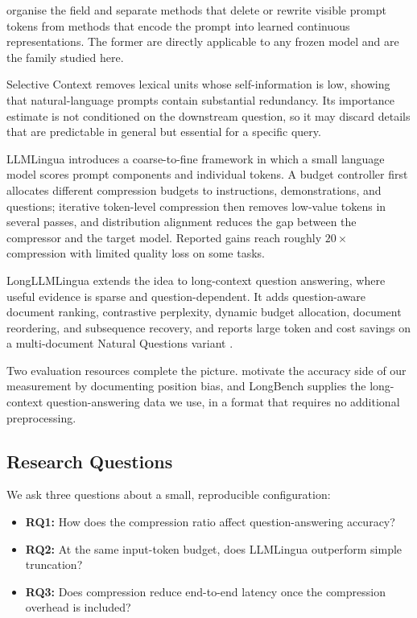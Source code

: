 \documentclass[10pt,a4paper,twocolumn]{article}
\begin{document}
\citet{li-etal-2025-prompt-survey} organise the field and separate methods that
delete or rewrite visible prompt tokens from methods that encode the prompt into
learned continuous representations. The former are directly applicable to any
frozen model and are the family studied here.

Selective Context \citep{li-etal-2023-compressing} removes lexical units whose
self-information is low, showing that natural-language prompts contain
substantial redundancy. Its importance estimate is not conditioned on the
downstream question, so it may discard details that are predictable in general but
essential for a specific query.

LLMLingua \citep{jiang-etal-2023-llmlingua} introduces a coarse-to-fine framework
in which a small language model scores prompt components and individual tokens.
A budget controller first allocates different compression budgets to instructions,
demonstrations, and questions; iterative token-level compression then removes
low-value tokens in several passes, and distribution alignment reduces the gap
between the compressor and the target model. Reported gains reach roughly
$20\times$ compression with limited quality loss on some tasks.

LongLLMLingua \citep{jiang-etal-2024-longllmlingua} extends the idea to
long-context question answering, where useful evidence is sparse and
question-dependent. It adds question-aware document ranking, contrastive
perplexity, dynamic budget allocation, document reordering, and subsequence
recovery, and reports large token and cost savings on a multi-document Natural
Questions variant \citep{kwiatkowski-etal-2019-natural}.

Two evaluation resources complete the picture. \citet{liu-etal-2024-lost} motivate
the accuracy side of our measurement by documenting position bias, and LongBench
\citep{bai-etal-2024-longbench} supplies the long-context question-answering data
we use, in a format that requires no additional preprocessing.

\subsection{Research Questions}

We ask three questions about a small, reproducible configuration:

\begin{itemize}
    \item \textbf{RQ1:} How does the compression ratio affect question-answering
    accuracy?
    \item \textbf{RQ2:} At the same input-token budget, does LLMLingua outperform
    simple truncation?
    \item \textbf{RQ3:} Does compression reduce end-to-end latency once the
    compression overhead is included?
\end{itemize}
\end{document}
